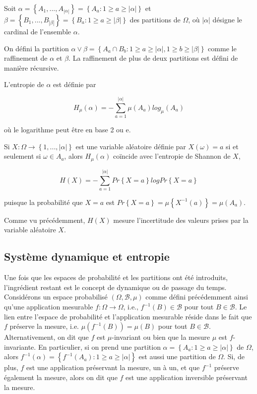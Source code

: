 \vspace{2ex}
Soit $\alpha = \left\{A_1,..., A_{|\alpha|}\right\}=\left\{A_a : 1 \geq a \geq |\alpha|\right\}$ et $\beta = \left\{B_1,..., B_{|\beta|}\right\}=\left\{B_a : 1 \geq a \geq |\beta|\right\}$ des partitions de $\Omega$, où $|\alpha|$ désigne le cardinal de l'ensemble $\alpha$.

\vspace{2ex}
On défini la partition $\alpha \lor \beta = \left\{A_a \cap B_b : 1 \geq a \geq |\alpha|, 1 \geq b \geq |\beta|\right\}$ comme le raffinement de $\alpha$ et $\beta$. La raffinement de plus de deux partitions est défini de manière récursive.

\vspace{2ex}
L'entropie de $\alpha$ est définie par

\begin{equation}
    H_{\mu}(\alpha) = - \sum_{a=1}^{|\alpha|}\mu(A_a)log_{\mu}(A_a)
\end{equation}

où le logarithme peut être en base 2 ou e.

\vspace{2ex}
Si $X : \Omega \longrightarrow \left\{1,...,|\alpha|\right\}$ est une variable aléatoire définie par $X(\omega) = a$ si et seulement si $\omega \in A_a$, alors $H_\mu(\alpha)$ coïncide avec l'entropie de Shannon de $X$,

\begin{equation}
    H(X) = - \sum_{a=1}^{|\alpha|}Pr\left\{X=a\right\}logPr\left\{X=a\right\}
\end{equation}

puisque la probabilité que $X=a$ est $Pr\left\{X=a\right\}=\mu\left\{X^{-1}(a)\right\}=\mu(A_a)$.

Comme vu précédemment, $H(X)$ mesure l'incertitude des valeurs prises par la variable aléatoire $X$.

\subsection*{Système dynamique et entropie}

\vspace{2ex}
Une fois que les espaces de probabilité et les partitions ont été introduits, l'ingrédient restant est le concept de dynamique ou de passage du temps.
Considérons un espace probabilisé $(\Omega,\mathcal{B},\mu)$ comme défini précédemment ainsi qu'une application mesurable $f : \Omega \longrightarrow \Omega$, i.e., $f^{-1}(B) \in \mathcal{B}$ pour tout $B \in \mathcal{B}$. Le lien entre l'espace de probabilité et l'application mesurable réside dans le fait que $f$ préserve la mesure, i.e. $\mu(f^{-1}(B))=\mu(B)$ pour tout $B \in \mathcal{B}$. Alternativement, on dit que $f$ est $\mu$-invariant ou bien que la mesure $\mu$ est $f$-invariante. En particulier, si on prend une partition $\alpha =\left\{A_a : 1 \geq a \geq |\alpha|\right\}$ de $\Omega$, alors $f^{-1}(\alpha) =\left\{f^{-1}(A_a) : 1 \geq a \geq |\alpha|\right\}$ est aussi une partition de $\Omega$.
Si, de plus, $f$ est une application préservant la mesure, un à un, et que $f^{-1}$ préserve également la mesure, alors on dit que $f$ est une application inversible préservant la mesure.


